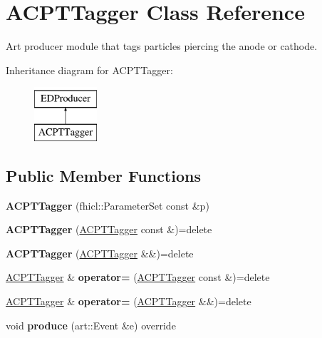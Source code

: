 \hypertarget{classACPTTagger}{\section{A\-C\-P\-T\-Tagger Class Reference}
\label{classACPTTagger}
}


Art producer module that tags particles piercing the anode or cathode.  


Inheritance diagram for A\-C\-P\-T\-Tagger\-:\begin{figure}[H]
\begin{center}
\leavevmode
\includegraphics[height=2.000000cm]{classACPTTagger}
\end{center}
\end{figure}
\subsection*{Public Member Functions}
\begin{DoxyCompactItemize}
\item 
\hypertarget{classACPTTagger_a40826f58d28a7a25c0eeab2db30fa348}{{\bfseries A\-C\-P\-T\-Tagger} (fhicl\-::\-Parameter\-Set const \&p)}\label{classACPTTagger_a40826f58d28a7a25c0eeab2db30fa348}

\item 
\hypertarget{classACPTTagger_a97c00ff11dd51943192529d7532344f3}{{\bfseries A\-C\-P\-T\-Tagger} (\hyperlink{classACPTTagger}{A\-C\-P\-T\-Tagger} const \&)=delete}\label{classACPTTagger_a97c00ff11dd51943192529d7532344f3}

\item 
\hypertarget{classACPTTagger_acedfdf5c74d9ac721b5eb04420763c4f}{{\bfseries A\-C\-P\-T\-Tagger} (\hyperlink{classACPTTagger}{A\-C\-P\-T\-Tagger} \&\&)=delete}\label{classACPTTagger_acedfdf5c74d9ac721b5eb04420763c4f}

\item 
\hypertarget{classACPTTagger_afd87968bb97f886f421f588053423c63}{\hyperlink{classACPTTagger}{A\-C\-P\-T\-Tagger} \& {\bfseries operator=} (\hyperlink{classACPTTagger}{A\-C\-P\-T\-Tagger} const \&)=delete}\label{classACPTTagger_afd87968bb97f886f421f588053423c63}

\item 
\hypertarget{classACPTTagger_a4214057b2ad88e7e92393c5c005be228}{\hyperlink{classACPTTagger}{A\-C\-P\-T\-Tagger} \& {\bfseries operator=} (\hyperlink{classACPTTagger}{A\-C\-P\-T\-Tagger} \&\&)=delete}\label{classACPTTagger_a4214057b2ad88e7e92393c5c005be228}

\item 
\hypertarget{classACPTTagger_a263217e3f0e822270756d498623788fb}{void {\bfseries produce} (art\-::\-Event \&e) override}\label{classACPTTagger_a263217e3f0e822270756d498623788fb}

\end{DoxyCompactItemize}


